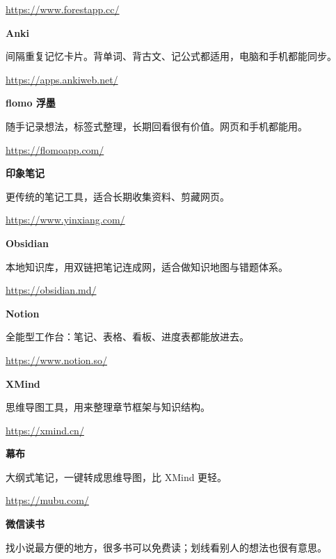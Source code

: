 \documentclass[a4paper,10pt]{article}
\begin{document}
{\small\url{https://www.forestapp.cc/}}\par
\vspace{0.25\baselineskip}
\noindent\textbf{Anki}\par
间隔重复记忆卡片。背单词、背古文、记公式都适用，电脑和手机都能同步。

{\small\url{https://apps.ankiweb.net/}}\par
\vspace{0.25\baselineskip}
\noindent\textbf{flomo 浮墨}\par
随手记录想法，标签式整理，长期回看很有价值。网页和手机都能用。

{\small\url{https://flomoapp.com/}}\par
\vspace{0.25\baselineskip}
\noindent\textbf{印象笔记}\par
更传统的笔记工具，适合长期收集资料、剪藏网页。

{\small\url{https://www.yinxiang.com/}}\par
\vspace{0.25\baselineskip}
\noindent\textbf{Obsidian}\par
本地知识库，用双链把笔记连成网，适合做知识地图与错题体系。

{\small\url{https://obsidian.md/}}\par
\vspace{0.25\baselineskip}
\noindent\textbf{Notion}\par
全能型工作台：笔记、表格、看板、进度表都能放进去。

{\small\url{https://www.notion.so/}}\par
\vspace{0.25\baselineskip}
\noindent\textbf{XMind}\par
思维导图工具，用来整理章节框架与知识结构。

{\small\url{https://xmind.cn/}}\par
\vspace{0.25\baselineskip}
\noindent\textbf{幕布}\par
大纲式笔记，一键转成思维导图，比 XMind 更轻。

{\small\url{https://mubu.com/}}\par
\vspace{0.25\baselineskip}
\noindent\textbf{微信读书}\par
找小说最方便的地方，很多书可以免费读；划线看别人的想法也很有意思。
\end{document}
